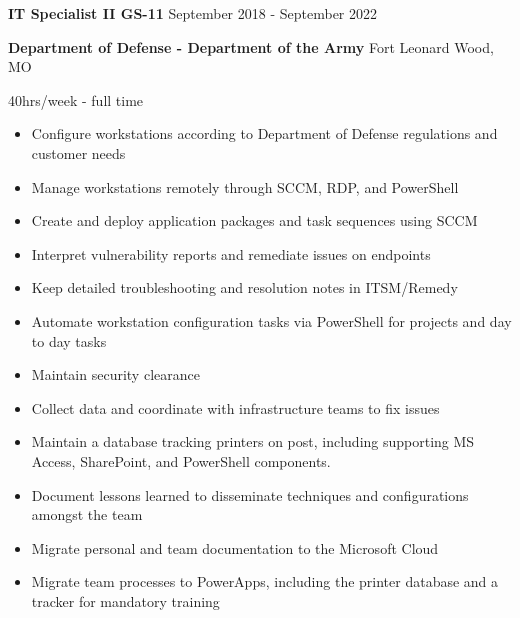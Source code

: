 \documentclass[../main.tex]{subfiles}
\begin{document}
    \textbf{IT Specialist II GS-11}
    \hfill
    September 2018 - September 2022
    
    \textbf{Department of Defense - Department of the Army}
    \hfill
    Fort Leonard Wood, MO
    
    \hfill
    40hrs/week - full time
    \begin{itemize}
        \item Configure workstations according to Department of Defense regulations and customer needs
        \item Manage workstations remotely through SCCM, RDP, and PowerShell
        \item Create and deploy application packages and task sequences using SCCM
        \item Interpret vulnerability reports and remediate issues on endpoints
        \item Keep detailed troubleshooting and resolution notes in ITSM/Remedy
        \item Automate workstation configuration tasks via PowerShell for projects and day to day tasks
        \item Maintain security clearance
        \item Collect data and coordinate with infrastructure teams to fix issues
        \item Maintain a database tracking printers on post, including supporting MS Access, SharePoint, and PowerShell components.
        \item Document lessons learned to disseminate techniques and configurations amongst the team
        \item Migrate personal and team documentation to the Microsoft Cloud
        \item Migrate team processes to PowerApps, including the printer database and a tracker for mandatory training
    \end{itemize}
\end{document}

